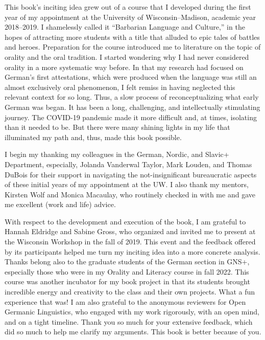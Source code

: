 \addchap{\lsAcknowledgementTitle} 


This book’s inciting idea grew out of a course that I developed during the first year of my appointment at the University of Wisconsin–Madison, academic year 2018--2019. I shamelessly called it “Barbarian Language and Culture,” in the hopes of attracting more students with a title that alluded to epic tales of battles and heroes. Preparation for the course introduced me to literature on the topic of orality and the oral tradition. I started wondering why I had never considered orality in a more systematic way before. In that my research had focused on German’s first attestations, which were produced when the language was still an almost exclusively oral phenomenon, I felt remiss in having neglected this relevant context for so long. Thus, a slow process of reconceptualizing what early German was began. It has been a long, challenging, and intellectually stimulating journey. The COVID-19 pandemic made it more difficult and, at times, isolating than it needed to be. But there were many shining lights in my life that illuminated my path and, thus, made this book possible.

I begin my thanking my colleagues in the German, Nordic, and Slavic+ Department, especially, Jolanda Vanderwal Taylor, Mark Louden, and Thomas DuBois for their support in navigating the not-insignificant bureaucratic aspects of these initial years of my appointment at the UW. I also thank my mentors, Kirsten Wolf and Monica Macaulay, who routinely checked in with me and gave me excellent (work and life) advice.

With respect to the development and execution of the book, I am grateful to Hannah Eldridge and Sabine Gross, who organized and invited me to present at the Wisconsin Workshop in the fall of 2019. This event and the feedback offered by its participants helped me turn my inciting idea into a more concrete analysis. Thanks belong also to the graduate students of the German section in GNS+, especially those who were in my Orality and Literacy course in fall 2022. This course was another incubator for my book project in that its students brought incredible energy and creativity to the class and their own projects. What a fun experience that was! I am also grateful to the anonymous reviewers for Open Germanic Linguistics, who engaged with my work rigorously, with an open mind, and on a tight timeline. Thank you so much for your extensive feedback, which did so much to help me clarify my arguments. This book is better because of you.

